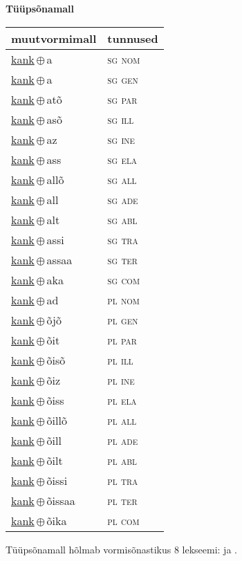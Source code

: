 

\vspace{3.5em}
\noindent \begin{minipage}{\textwidth}
\noindent \textbf{Tüüpsõnamall \,}\\

\begin{sideways}
\begin{tabular}{l l}
muutvormimall & tunnused \\
\hline
\underline{kank}\,$\oplus$\,a & \textsc{ sg nom } \\
\underline{kank}\,$\oplus$\,a & \textsc{ sg gen } \\
\underline{kank}\,$\oplus$\,atõ & \textsc{ sg par } \\
\underline{kank}\,$\oplus$\,asõ & \textsc{ sg ill } \\
\underline{kank}\,$\oplus$\,az & \textsc{ sg ine } \\
\underline{kank}\,$\oplus$\,ass & \textsc{ sg ela } \\
\underline{kank}\,$\oplus$\,allõ & \textsc{ sg all } \\
\underline{kank}\,$\oplus$\,all & \textsc{ sg ade } \\
\underline{kank}\,$\oplus$\,alt & \textsc{ sg abl } \\
\underline{kank}\,$\oplus$\,assi & \textsc{ sg tra } \\
\underline{kank}\,$\oplus$\,assaa & \textsc{ sg ter } \\
\underline{kank}\,$\oplus$\,aka & \textsc{ sg com } \\
\underline{kank}\,$\oplus$\,ad & \textsc{ pl nom } \\
\underline{kank}\,$\oplus$\,õjõ & \textsc{ pl gen } \\
\underline{kank}\,$\oplus$\,õit & \textsc{ pl par } \\
\underline{kank}\,$\oplus$\,õisõ & \textsc{ pl ill } \\
\underline{kank}\,$\oplus$\,õiz & \textsc{ pl ine } \\
\underline{kank}\,$\oplus$\,õiss & \textsc{ pl ela } \\
\underline{kank}\,$\oplus$\,õillõ & \textsc{ pl all } \\
\underline{kank}\,$\oplus$\,õill & \textsc{ pl ade } \\
\underline{kank}\,$\oplus$\,õilt & \textsc{ pl abl } \\
\underline{kank}\,$\oplus$\,õissi & \textsc{ pl tra } \\
\underline{kank}\,$\oplus$\,õissaa & \textsc{ pl ter } \\
\underline{kank}\,$\oplus$\,õika & \textsc{ pl com } \\
\end{tabular}
\end{sideways}
\label{tab:tüüpsõnamall-kanka}

\end{minipage}

 
\vspace{1em}
\noindent Tüüpsõnamall  hõlmab vormisõnastikus 8 lekseemi:  ja .
